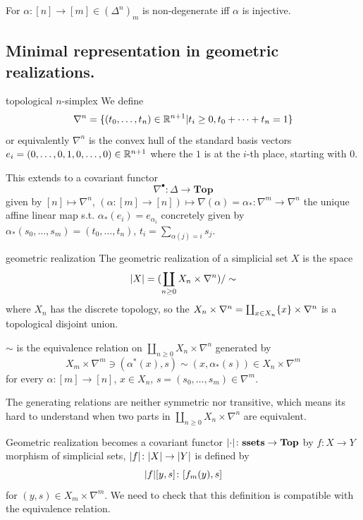 \documentclass[language=english]{TemplateLecture}
\begin{document}
\begin{example}
    For \(\alpha\colon [n]\to [m] \in (\Delta^n)_m\) is non-degenerate iff \(\alpha\) is injective.
\end{example}

\subsection{Minimal representation in geometric realizations.}

\begin{defi}{topological \(n\)-simplex}{}
    We define
    \[\nabla^n = \{(t_0,\dots, t_n)\in\mathbb{R}^{n+1} | t_i \geq 0, t_0+\dots+t_n = 1\}\]
    or equivalently
    \(\nabla^n\) is the convex hull of the standard basis vectors \(e_i = (0, \dots, 0, 1, 0, \dots, 0)\in \mathbb{R}^{n+1}\) where the \(1\) is at the \(i\)-th place, starting with \(0\).
\end{defi}

This extends to a covariant functor
\[\nabla^\bullet\colon \Delta\to \mathbf{Top}\]
given by \([n]\mapsto \nabla^n\), \((\alpha\colon [m]\to [n])\mapsto \nabla(\alpha) = \alpha_*\colon \nabla^m\to \nabla^n\) the unique affine linear map s.t. \(\alpha_*(e_i) = e_{\alpha_i}\) concretely given by \(\alpha_*(s_0, \dots, s_m) = (t_0, \dots, t_n)\), \(t_i = \sum_{\alpha(j) = i} s_j\).

\begin{defi}{geometric realization}{}
    The geometric realization of a simplicial set \(X\) is the space
    \[\lvert X\rvert = (\coprod_{n\geq 0} X_n \times \nabla^n)/\sim\]
    where \(X_n\) has the discrete topology, so the \(X_n \times \nabla^n = \coprod_{x\in X_n}\{x\}\times \nabla^n\) is a topological disjoint union.

    \(\sim\) is the equivalence relation on \(\coprod_{n\geq 0} X_n \times \nabla^n\) generated by
    \[X_m \times \nabla^m \ni (\alpha^*(x), s) \sim (x, \alpha_*(s)) \in X_n\times \nabla^m\]
    for every \(\alpha\colon[m]\to [n]\), \(x\in X_n\), \(s= (s_0, \dots, s_m)\in \nabla^m\).
\end{defi}

The generating relations are neither symmetric nor transitive, which means its hard to understand when two parts in \(\coprod_{n\geq 0} X_n\times \nabla^n\) are equivalent.

Geometric realization becomes a covariant functor \(\lvert\cdot\rvert\colon \mathbf{ssets}\to \mathbf{Top}\) by \(f\colon X\to Y\) morphism of simplicial sets, \(\lvert f\rvert\colon \lvert X\rvert\to \lvert Y\rvert\) is defined by
\[\lvert f\rvert[y,s]\colon [f_m(y), s]\]
for \((y,s)\in X_m\times \nabla^m\). We need to check that this definition is compatible with the equivalence relation.
\end{document}
